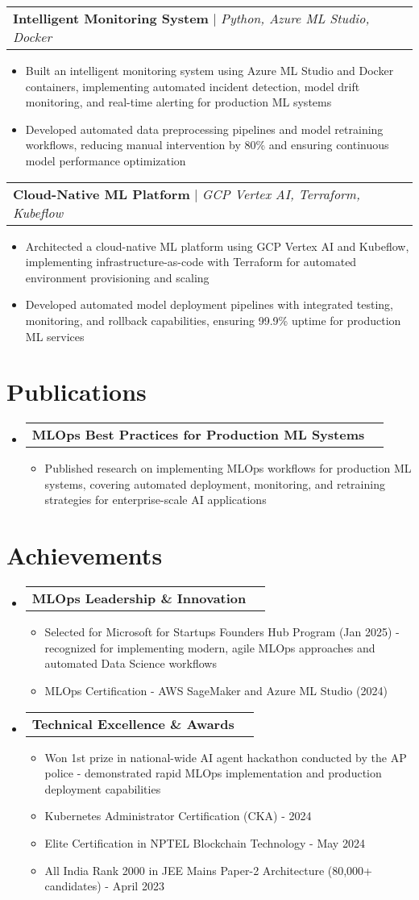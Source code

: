 \documentclass[letterpaper,11pt]{article}
\makeatletter
\newcommand{\resumeItem}[1]{
  \item\small{
    {#1 \vspace{-2pt}}
  }
}
\newcommand{\resumeProjectHeading}[2]{
    \item
    \begin{tabular*}{0.97\textwidth}{l@{\extracolsep{\fill}}r}
      \small#1 & #2 \\
    \end{tabular*}\vspace{-7pt}
}
\newcommand{\resumeSubHeadingListStart}{\begin{itemize}[leftmargin=0.15in, label={}]}
\newcommand{\resumeSubHeadingListEnd}{\end{itemize}}
\newcommand{\resumeItemListStart}{\begin{itemize}}
\newcommand{\resumeItemListEnd}{\end{itemize}\vspace{-5pt}}
\makeatother
\begin{document}
\resumeProjectHeading
{\textbf{Intelligent Monitoring System} $|$ \emph{Python, Azure ML Studio, Docker}}{}
  \resumeItemListStart
    \resumeItem{Built an intelligent monitoring system using Azure ML Studio and Docker containers, implementing automated incident detection, model drift monitoring, and real-time alerting for production ML systems}
    \resumeItem{Developed automated data preprocessing pipelines and model retraining workflows, reducing manual intervention by 80\% and ensuring continuous model performance optimization}
    \resumeItemListEnd

\resumeProjectHeading
  {\textbf{Cloud-Native ML Platform} $|$ \emph{GCP Vertex AI, Terraform, Kubeflow}}{}
  \resumeItemListStart
    \resumeItem{Architected a cloud-native ML platform using GCP Vertex AI and Kubeflow, implementing infrastructure-as-code with Terraform for automated environment provisioning and scaling}
    \resumeItem{Developed automated model deployment pipelines with integrated testing, monitoring, and rollback capabilities, ensuring 99.9\% uptime for production ML services}
\resumeItemListEnd

\section{Publications}
  \resumeSubHeadingListStart
    \resumeProjectHeading
      {\textbf{MLOps Best Practices for Production ML Systems}}{}
    \resumeItemListStart
      \resumeItem{Published research on implementing MLOps workflows for production ML systems, covering automated deployment, monitoring, and retraining strategies for enterprise-scale AI applications}
    \resumeItemListEnd
  \resumeSubHeadingListEnd

\section{Achievements}
  \resumeSubHeadingListStart
    \resumeProjectHeading
      {\textbf{MLOps Leadership \& Innovation}}{}
      \vspace{0.02em} %
      \resumeItemListStart
        \resumeItem{Selected for Microsoft for Startups Founders Hub Program (Jan 2025) - recognized for implementing modern, agile MLOps approaches and automated Data Science workflows}
        \resumeItem{MLOps Certification - AWS SageMaker and Azure ML Studio (2024)}
      \resumeItemListEnd
    
    \resumeProjectHeading
      {\textbf{Technical Excellence \& Awards}}{}
      \vspace{0.02em} %
      \resumeItemListStart
        \resumeItem{Won 1st prize in national-wide AI agent hackathon conducted by the AP police - demonstrated rapid MLOps implementation and production deployment capabilities}
        \resumeItem{Kubernetes Administrator Certification (CKA) - 2024}
        \resumeItem{Elite Certification in NPTEL Blockchain Technology - May 2024}
        \resumeItem{All India Rank 2000 in JEE Mains Paper-2 Architecture (80,000+ candidates) - April 2023}
      \resumeItemListEnd
  \resumeSubHeadingListEnd
\end{document}
